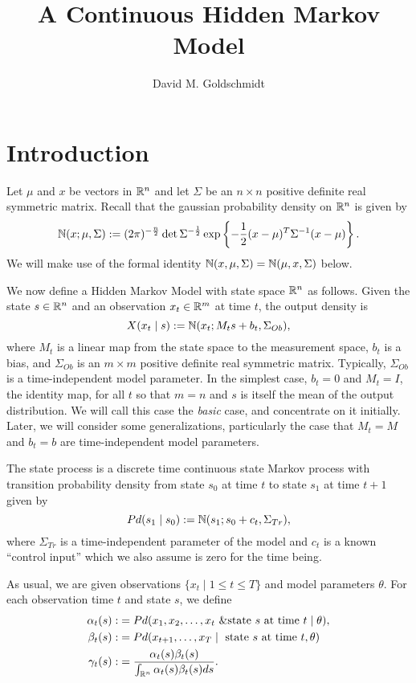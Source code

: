 \documentclass[12pt,leqno]{article}
\title{A Continuous Hidden Markov Model}
\author{David M. Goldschmidt}
\begin{document}
\newcommand{\p}{\ensuremath{u}}
\newcommand{\VV}{V}
\maketitle


\section{Introduction}
Let $\mu$ and $x$ be vectors in ${\mathbb R}^n$ and let $\Sigma$ be an $n\times{n}$ positive
definite real symmetric matrix.  Recall that the gaussian probability density
on ${\mathbb R}^n$ is given by 
$$
{\mathbb N}(x;\mu,\Sigma) := (2\pi)^{-\frac{n}{2}}\det{\Sigma}^{-\frac{1}{2}}\exp\left\{-\frac{1}{2}
(x - \mu)^T\Sigma^{-1}(x-\mu)\right\}.
$$
We will make use of the formal identity ${\mathbb N}(x,\mu,\Sigma) = {\mathbb N}(\mu,x,\Sigma)$ below.

We now define a Hidden Markov Model with state space ${\mathbb R}^n$ as follows.  Given the state $s\in{\mathbb R}^n$ and an observation $x_t\in{\mathbb R}^m$ at time $t$, the output density is
$$
X(x_t\mid s) := {\mathbb N}(x_t;M_ts + b_t,\Sigma_{Ob}),
$$
where $M_t$ is a linear map from the state space to the
measurement space, $b_t$ is a bias, and $\Sigma_{Ob}$ is an $m\times{m}$ positive definite real symmetric matrix.  Typically, $\Sigma_{Ob}$ is a time-independent model parameter.
In the simplest case, $b_t = 0$  and $M_t = I$, the identity map, for all $t$ so that $m = n$ and $s$ is itself the mean of the output distribution.  We will call this case the {\em basic} case, and concentrate on it initially. Later, we will consider some generalizations, particularly the case that $M_t = M$ and $b_t = b$ are time-independent model parameters.

The state process is a discrete time continuous state Markov process with transition probability density
from state $s_0$ at time $t$ to state $s_1$ at time $t+1$ given by
$$
Pd(s_1\mid s_0) :=  {\mathbb N}(s_1;s_0+c_t,\Sigma_{Tr}),
$$
where $\Sigma_{Tr}$ is a time-independent parameter of the model
and $c_t$ is a known ``control input'' which we also assume is zero for the time being.

As usual, we are given observations $\{x_t\mid 1\le t\le T\}$ and model parameters $\theta$.  For each observation time $t$ and state $s$, we define
\begin{align*}
  \alpha_t(s) :&= Pd(x_1,x_2,\dots,x_t~ \& \text{state $s$ at time $t$}\mid \theta ),\\
  \beta_t(s) :&= Pd(x_{t+1},\dots,x_T \mid ~\text{state $s$ at time $t$},\theta)\\
  \gamma_t(s) :&= \frac{\alpha_t(s)\beta_t(s)}{\int_{{\mathbb R}^n}\alpha_t(s)\beta_t(s)ds}.
\end{align*}
\end{document}
